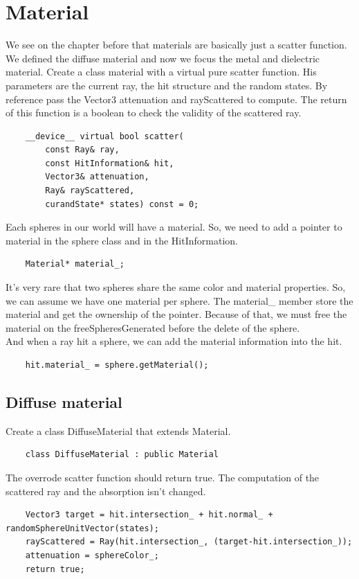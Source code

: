 \documentclass{article}
\begin{document}
\section{Material}
We see on the chapter before that materials are basically just a scatter function. We defined the diffuse material and now we focus the metal and dielectric material. Create a class material with a virtual pure scatter function. His parameters are the current ray, the hit structure and the random states. By reference pass the Vector3 attenuation and rayScattered to compute. The return of this function is a boolean to check the validity of the scattered ray.
\begin{lstlisting}
	__device__ virtual bool scatter(
		const Ray& ray,
		const HitInformation& hit,
		Vector3& attenuation,
		Ray& rayScattered,
		curandState* states) const = 0;
\end{lstlisting}

Each spheres in our world will have a material. So, we need to add a pointer to material in the sphere class and in the HitInformation.

\begin{lstlisting}
	Material* material_;
\end{lstlisting}

It's very rare that two spheres share the same color and material properties. So, we can assume we have one material per sphere. The material\_ member store the material and get the ownership of the pointer. Because of that, we must free the material on the freeSpheresGenerated before the delete of the sphere.\\
And when a ray hit a sphere, we can add the material information into the hit.

\begin{lstlisting}
	hit.material_ = sphere.getMaterial();
\end{lstlisting}

\subsection{Diffuse material}
Create a class DiffuseMaterial that extends Material.
\begin{lstlisting}
	class DiffuseMaterial : public Material
\end{lstlisting}

The overrode scatter function should return true. The computation of the scattered ray and the absorption isn't changed.

\begin{lstlisting}
	Vector3 target = hit.intersection_ + hit.normal_ + randomSphereUnitVector(states);
	rayScattered = Ray(hit.intersection_, (target-hit.intersection_));
	attenuation = sphereColor_;
	return true;
\end{lstlisting}
\end{document}
